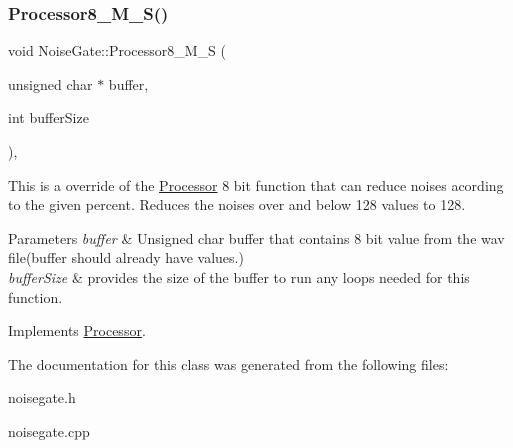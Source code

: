 \subsubsection{\texorpdfstring{Processor8\+\_\+\+M\+\_\+\+S()}{Processor8\_M\_S()}}
{\footnotesize\ttfamily void Noise\+Gate\+::\+Processor8\+\_\+\+M\+\_\+S (\begin{DoxyParamCaption}\item[{unsigned char $\ast$}]{buffer,  }\item[{int}]{buffer\+Size }\end{DoxyParamCaption})\hspace{0.3cm}{\ttfamily [override]}, {\ttfamily [virtual]}}



This is a override of the \hyperlink{classProcessor}{Processor} 8 bit function that can reduce noises acording to the given percent. Reduces the noises over and below 128 values to 128. 


\begin{DoxyParams}{Parameters}
{\em buffer} & Unsigned char buffer that contains 8 bit value from the wav file(buffer should already have values.) \\
\hline
{\em buffer\+Size} & provides the size of the buffer to run any loops needed for this function. \\
\hline
\end{DoxyParams}


Implements \hyperlink{classProcessor}{Processor}.



The documentation for this class was generated from the following files\+:\begin{DoxyCompactItemize}
\item 
noisegate.\+h\item 
noisegate.\+cpp\end{DoxyCompactItemize}
